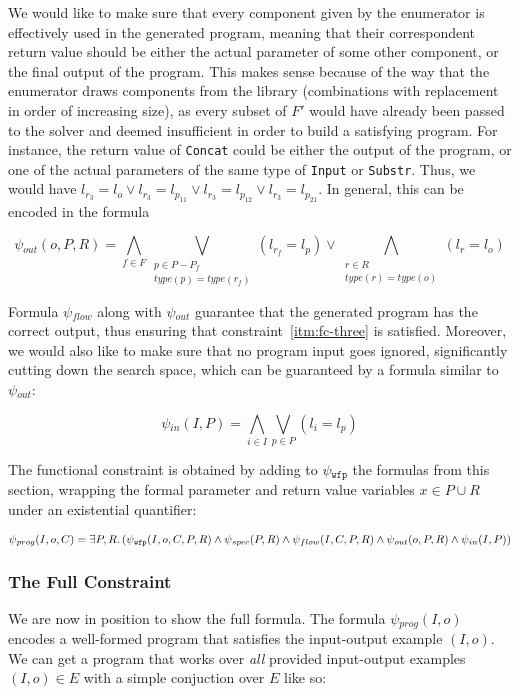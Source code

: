 \noindent
We would like to make sure that every component given by the enumerator is
effectively used in the generated program, meaning that their correspondent
return value should be either the actual parameter of some other component, or
the final output of the program. This makes sense because of the way that the
enumerator draws components from the library (combinations with replacement in
order of increasing size), as every subset of $F'$ would have already been
passed to the solver and deemed insufficient in order to build a satisfying
program. For instance, the return value of \lstinline{Concat} could be either
the output of the program, or one of the actual parameters of the same type of
\lstinline{Input} or \lstinline{Substr}. Thus, we would have
$l_{r_3} = l_o \vee l_{r_3} = l_{p_{11}} \vee l_{r_3} = l_{p_{12}} \vee l_{r_3} = l_{p_{21}}$.
In general, this can be encoded in the formula

\[
  \psi{}_{out}(o, P, R) =
  \bigwedge_{f \in F}
  \bigvee_{\substack{p \in P - P_f \\ type(p) = type(r_f)}}(l_{r_f} = l_p)
  \vee \bigwedge_{\substack{r \in R \\ type(r) = type(o)}} (l_{r} = l_o)
\]

\noindent
Formula $\psi{}_{flow}$ along with $\psi{}_{out}$ guarantee that the generated
program has the correct output, thus ensuring that constraint~\ref{itm:fc-three}
is satisfied. Moreover, we would also like to make sure that no program input
goes ignored, significantly cutting down the search space, which can be
guaranteed by a formula similar to $\psi{}_{out}$:

\[
  \psi{}_{in}(I, P) = \bigwedge_{i \in I}\bigvee_{p \in P}(l_i = l_p)
\]

The functional constraint is obtained by adding to $\psi{}_{\mathtt{wfp}}$ the
formulas from this section, wrapping the formal parameter and return value
variables $x \in P \cup R$ under an existential quantifier:

\[
  \psi{}_{prog}(I, o, C) = \exists P,R\ldotp
  (\psi{}_{\mathtt{wfp}}(I, o, C, P, R) \wedge
  \psi{}_{spec}(P, R) \wedge
  \psi{}_{flow}(I, C, P, R) \wedge 
  \psi{}_{out}(o, P, R) \wedge
  \psi{}_{in}(I, P))
\]


\subsubsection{The Full Constraint}
\label{sec:full-constraint}

We are now in position to show the full formula. The formula $\psi{}_{prog}(I,
o)$ encodes a well-formed program that satisfies the input-output example $(I,
o)$. We can get a program that works over \textit{all} provided
input-output examples $(I, o) \in E$ with a simple conjuction over $E$ like so:

